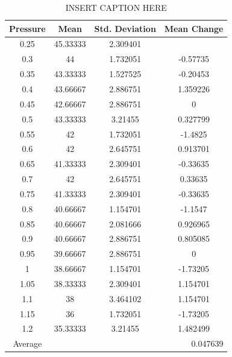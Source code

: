 \documentclass[letterpaper]{article}
\begin{document}
\begin{table}[H]
 \centering
 \begin{tabular}{|c|c|c|c|}
  \hline
  Pressure & Mean                          & Std. Deviation & Mean Change \\ \hline
  0.25     & 45.33333                      & 2.309401       &             \\ \hline
  0.3      & 44                            & 1.732051       & -0.57735    \\ \hline
  0.35     & 43.33333                      & 1.527525       & -0.20453    \\ \hline
  0.4      & 43.66667                      & 2.886751       & 1.359226    \\ \hline
  0.45     & 42.66667                      & 2.886751       & 0           \\ \hline
  0.5      & 43.33333                      & 3.21455        & 0.327799    \\ \hline
  0.55     & 42                            & 1.732051       & -1.4825     \\ \hline
  0.6      & 42                            & 2.645751       & 0.913701    \\ \hline
  0.65     & 41.33333                      & 2.309401       & -0.33635    \\ \hline
  0.7      & 42                            & 2.645751       & 0.33635     \\ \hline
  0.75     & 41.33333                      & 2.309401       & -0.33635    \\ \hline
  0.8      & 40.66667                      & 1.154701       & -1.1547     \\ \hline
  0.85     & 40.66667                      & 2.081666       & 0.926965    \\ \hline
  0.9      & 40.66667                      & 2.886751       & 0.805085    \\ \hline
  0.95     & 39.66667                      & 2.886751       & 0           \\ \hline
  1        & 38.66667                      & 1.154701       & -1.73205    \\ \hline
  1.05     & 38.33333                      & 2.309401       & 1.154701    \\ \hline
  1.1      & 38                            & 3.464102       & 1.154701    \\ \hline
  1.15     & 36                            & 1.732051       & -1.73205    \\ \hline
  1.2      & 35.33333                      & 3.21455        & 1.482499    \\ \hline
  Average  & \multicolumn{3}{r|}{0.047639}                                \\ \hline
 \end{tabular}
 \caption{INSERT CAPTION HERE}
 \label{pressurestat}
\end{table}
\end{document}
